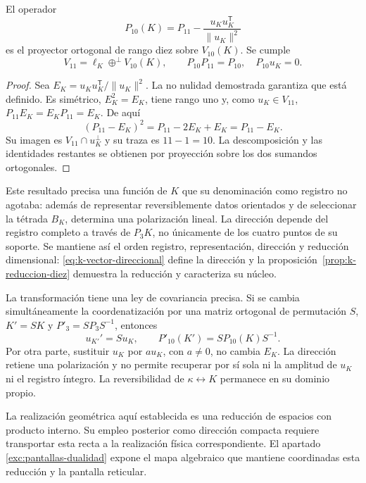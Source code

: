 \begin{proposition}
\label{prop:k-reduccion-diez}
El operador
\begin{equation}
 P_{10}(K)=P_{11}
       -\frac{u_Ku_K^{\mathsf T}}{\lVert u_K\rVert^2}
 \label{eq:k-proyector-diez}
\end{equation}
es el proyector ortogonal de rango diez sobre \(V_{10}(K)\). Se cumple
\[
 V_{11}=\ell_K\mathbin{\oplus^{\perp}}V_{10}(K),
 \qquad P_{10}P_{11}=P_{10},\quad P_{10}u_K=0.
\]
\end{proposition}
\begin{proof}
Sea \(E_K=u_Ku_K^{\mathsf T}/\lVert u_K\rVert^2\). La
no nulidad demostrada garantiza que está definido. Es simétrico,
\(E_K^2=E_K\), tiene rango uno y, como \(u_K\in V_{11}\),
\(P_{11}E_K=E_KP_{11}=E_K\). De aquí
\[
 (P_{11}-E_K)^2=P_{11}-2E_K+E_K=P_{11}-E_K.
\]
Su imagen es \(V_{11}\cap u_K^\perp\) y su traza es
\(11-1=10\). La descomposición y las identidades restantes se
obtienen por proyección sobre los dos sumandos ortogonales.
\end{proof}

Este resultado precisa una función de \(K\) que su denominación como
registro no agotaba: además de representar reversiblemente datos
orientados y de seleccionar la tétrada \(B_K\), determina una
polarización lineal. La dirección depende del registro completo a
través de \(P_3K\), no únicamente de los cuatro puntos de su soporte.
Se mantiene así el orden registro, representación, dirección y
reducción dimensional: \eqref{eq:k-vector-direccional} define la
dirección y la proposición~\ref{prop:k-reduccion-diez} demuestra
la reducción y caracteriza su núcleo.

La transformación tiene una ley de covariancia precisa. Si se cambia
simultáneamente la coordenatización por una matriz ortogonal de permutación \(S\),
\(K'=SK\) y \(P'_3=SP_3S^{-1}\), entonces
\[
 u_{K'}'=Su_K,\qquad P'_{10}(K')=SP_{10}(K)S^{-1}.
\]
Por otra parte, sustituir \(u_K\) por \(a u_K\), con \(a\ne0\),
no cambia \(E_K\). La dirección retiene una polarización y no
permite recuperar por sí sola ni la amplitud de \(u_K\) ni el
registro íntegro. La reversibilidad de \(\kappa\leftrightarrow K\)
permanece en su dominio propio.

La realización geométrica aquí establecida es una reducción de espacios
con producto interno. Su empleo posterior como dirección compacta
requiere transportar esta recta a la realización física correspondiente.
El apartado \ref{exc:pantallas-dualidad} expone el mapa algebraico
que mantiene coordinadas esta reducción y la pantalla reticular.
